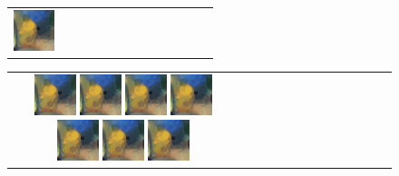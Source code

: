 \documentclass[3p,times,procedia]{elsarticle}
\begin{document}
\begin{figure}[H]
\begin{tabular}{c c c c c c c c c c c c c}
        \includegraphics[width=12mm]{figures/mul/cafe_terrace_at_nightpass24_best.png}
        \\
    \end{tabular}
    \begin{tabular}{c c c c c c c c c c c c c}
        \includegraphics[width=12mm]{figures/mul/cafe_terrace_at_nightpass25_best.png}
        
        \includegraphics[width=12mm]{figures/mul/cafe_terrace_at_nightpass26_best.png}
        
        \includegraphics[width=12mm]{figures/mul/cafe_terrace_at_nightpass27_best.png}
        
        \includegraphics[width=12mm]{figures/mul/cafe_terrace_at_nightpass28_best.png}
        
        \includegraphics[width=12mm]{figures/mul/cafe_terrace_at_nightpass29_best.png}
        
        \includegraphics[width=12mm]{figures/mul/cafe_terrace_at_nightpass30_best.png}
        
        \includegraphics[width=12mm]{figures/mul/cafe_terrace_at_nightpass31_best.png}
        

\end{tabular}
\end{figure}
\end{document}
